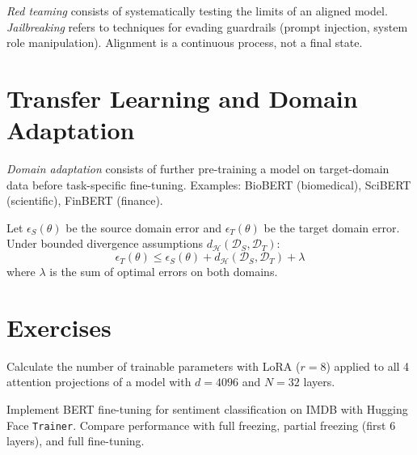 \begin{warning}[title=\textbf{Red teaming and jailbreaking}]
\emph{Red teaming} consists of systematically testing the limits of an aligned
model. \emph{Jailbreaking} refers to techniques for evading guardrails (prompt
injection, system role manipulation). Alignment is a continuous process, not a
final state.
\end{warning}

\section{Transfer Learning and Domain Adaptation}
\label{sec:ft:transfer}

\begin{definition}
\emph{Domain adaptation} consists of further pre-training a model on
target-domain data before task-specific fine-tuning. Examples: BioBERT
(biomedical), SciBERT (scientific), FinBERT (finance).
\end{definition}

\begin{theorem}
Let $\epsilon_S(\theta)$ be the source domain error and $\epsilon_T(\theta)$ be
the target domain error. Under bounded divergence assumptions
$d_{\mathcal{H}}(\mathcal{D}_S, \mathcal{D}_T)$:
\[
\epsilon_T(\theta) \leq \epsilon_S(\theta) + d_{\mathcal{H}}(\mathcal{D}_S, \mathcal{D}_T) + \lambda
\]
where $\lambda$ is the sum of optimal errors on both domains.
\end{theorem}

\section{Exercises}
\label{sec:ft:exercises}

\begin{exercise}[$\star$]
Calculate the number of trainable parameters with LoRA ($r=8$) applied to all
4 attention projections of a model with $d = 4096$ and $N = 32$ layers.
\end{exercise}

\begin{exercise}[$\star\star$]
Implement BERT fine-tuning for sentiment classification on IMDB with Hugging
Face \texttt{Trainer}. Compare performance with full freezing, partial freezing
(first 6 layers), and full fine-tuning.
\end{exercise}

